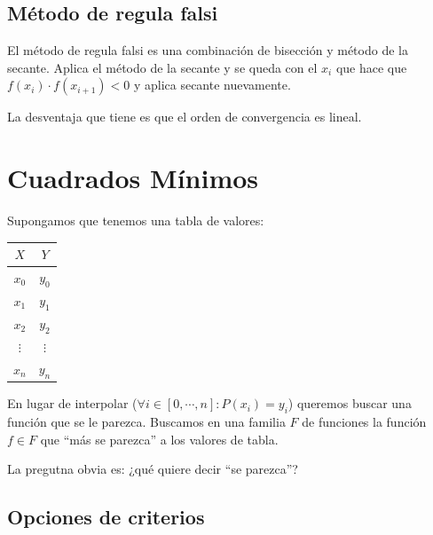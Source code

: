 \documentclass[]{article}
\begin{document}

\subsection{Método de regula falsi}
El método de regula falsi es una combinación de bisección y método de la secante. Aplica el método de la secante y se queda con el $x_i$ que hace que $f(x_i)\cdot f(x_{i+1})<0$ y aplica secante nuevamente.

La desventaja que tiene es que el orden de convergencia es lineal.

\newpage

\section{Cuadrados Mínimos}
Supongamos que tenemos una tabla de valores:
\begin{table}[h]\centering
	\begin{tabular}{|c|c|}
		\hline
		$X$				 & $Y$	   \\ \hline
		$x_0$	 & $y_0$ \\
		$x_1$ 	 & $y_1$ \\
		$x_2$ 	 & $y_2$ \\
		$\vdots$ & $\vdots$ \\
		$x_n$	 & $y_n$ \\
		\hline
	\end{tabular}
\end{table}

En lugar de interpolar ($\forall i\in [0,\cdots,n] : P(x_i) = y_i$) queremos buscar una función que se le parezca. Buscamos en una familia $F$ de funciones la función $f\in F$ que ``más se parezca'' a los valores de tabla.

La pregutna obvia es: ¿qué quiere decir ``se parezca''?
\subsection{Opciones de criterios}
\end{document}
